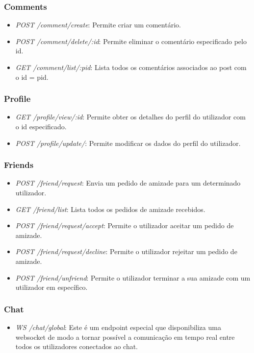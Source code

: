 \documentclass{article}
\begin{document}
	\subsubsection{Comments}
	
	\begin{itemize}
		\item \textit{POST /comment/create}: Permite criar um comentário.
		\item \textit{POST /comment/delete/:id}: Permite eliminar o comentário especificado pelo id.
		\item \textit{GET /comment/list/:pid}: Lista todos os comentários associados ao post com o id = pid.
	\end{itemize}
	
	
	\subsubsection{Profile}
	\begin{itemize}
		\item \textit{GET /profile/view/:id}: Permite obter os detalhes do perfil do utilizador com o id especificado.
		\item \textit{POST /profile/update/}: Permite modificar os dados do perfil do utilizador.
	\end{itemize}
	
	\subsubsection{Friends}
	\begin{itemize}
		\item \textit{POST /friend/request}: Envia um pedido de amizade para um determinado utilizador.
		\item \textit{GET /friend/list}: Lista todos os pedidos de amizade recebidos.
		\item \textit{POST /friend/request/accept}: Permite o utilizador aceitar um pedido de amizade.
		\item \textit{POST /friend/request/decline}: Permite o utilizador rejeitar um pedido de amizade.
		\item \textit{POST /friend/unfriend}: Permite o utilizador terminar a sua amizade com um utilizador em específico.
	\end{itemize}
	
	\subsubsection{Chat}
	\begin{itemize}
		\item \textit{WS /chat/global}: Este é um endpoint especial que disponibiliza uma websocket de modo a tornar possível a comunicação em tempo real entre todos os utilizadores conectados ao chat.
	\end{itemize}
\end{document}
